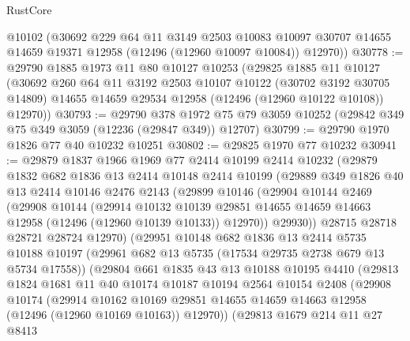 \begin{lexlean}{RustCore}
\begin{coremodule}
      @10102
      (@30692
        @229
        @64
        @11
        @3149
        @2503
        @10083
        @10097
        @30707
        @14655
        @14659
        @19371
        @12958
        (@12496 (@12960 @10097 @10084))
        @12970))
@30778 := @29790
    @1885
    @1973
    @11
    @80
    @10127
    @10253
    (@29825
      @1885
      @11
      @10127
      (@30692
        @260
        @64
        @11
        @3192
        @2503
        @10107
        @10122
        (@30702 @3192 @30705 @14809)
        @14655
        @14659
        @29534
        @12958
        (@12496 (@12960 @10122 @10108))
        @12970))
@30793 := @29790
    @378
    @1972
    @75
    @79
    @3059
    @10252
    (@29842 @349 @75 @349 @3059 (@12236 (@29847 @349)) @12707)
@30799 := @29790 @1970 @1826 @77 @40 @10232 @10251
@30802 := @29825 @1970 @77 @10232
@30941 := @29879
    @1837
    @1966
    @1969
    @77
    @2414
    @10199
    @2414
    @10232
    (@29879
      @1832
      @682
      @1836
      @13
      @2414
      @10148
      @2414
      @10199
      (@29889
        @349
        @1826
        @40
        @13
        @2414
        @10146
        @2476
        @2143
        (@29899
          @10146
          (@29904
            @10144
            @2469
            (@29908
              @10144
              (@29914
                @10132
                @10139
                @29851
                @14655
                @14659
                @14663
                @12958
                (@12496 (@12960 @10139 @10133))
                @12970))
            @29930))
        @28715
        @28718
        @28721
        @28724
        @12970)
      (@29951
        @10148
        @682
        @1836
        @13
        @2414
        @5735
        @10188
        @10197
        (@29961 @682 @13 @5735 (@17534 @29735 @2738 @679 @13 @5734 @17558))
        (@29804
          @661
          @1835
          @43
          @13
          @10188
          @10195
          @4410
          (@29813
            @1824
            @1681
            @11
            @40
            @10174
            @10187
            @10194
            @2564
            @10154
            @2408
            (@29908
              @10174
              (@29914
                @10162
                @10169
                @29851
                @14655
                @14659
                @14663
                @12958
                (@12496 (@12960 @10169 @10163))
                @12970))
            (@29813
              @1679
              @214
              @11
              @27
              @8413

\end{coremodule}
\end{lexlean}
